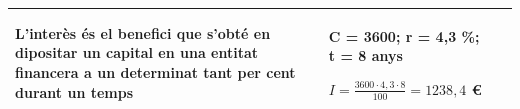 \begin{longtable}{|p{}|p{}|p{}|}
\begin{minipage}[t]{0.35\columnwidth}
L'interès és el benefici que s'obté en dipositar un capital en una
entitat financera a un determinat tant per cent durant un temps
\strut
\end{minipage} & \begin{minipage}[t]{0.38\columnwidth}\raggedright\strut
C = 3600; r = 4,3 \%; t = 8 anys

$I = \frac{3600 \cdot 4,3 \cdot 8}{100} = 1238,4$ \euro{}\strut
\end{minipage} \\ \hline
\end{longtable}
